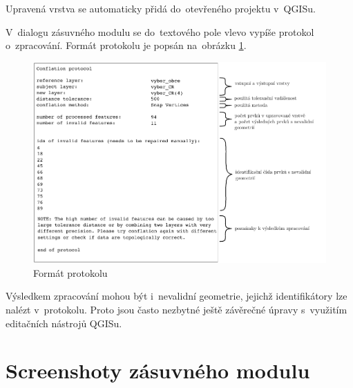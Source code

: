 Upravená vrstva se automaticky přidá do~otevřeného projektu v~QGISu.

V~dialogu zásuvného modulu se do~textového pole vlevo vypíše protokol o~zpracování.
Formát protokolu je popsán na~obrázku \ref{fig:protokol}.  

  \begin{figure}[H]
    \centering
      \includegraphics[width=420pt]{./pictures/protokol.pdf}
      \caption{Formát protokolu}
      \label{fig:protokol}
  \end{figure} 

Výsledkem zpracování mohou být i~nevalidní geometrie, jejichž identifikátory lze
nalézt v~protokolu. Proto jsou často nezbytné ještě závěrečné úpravy s~využitím
editačních nástrojů QGISu.


\chapter{Screenshoty zásuvného modulu}
\label{priloha-screenshoty}

